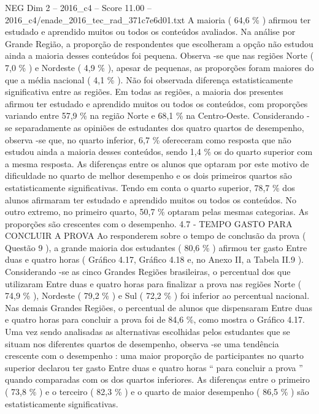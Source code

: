 \begin{textsample}{NEG Dim 2 – 2016\_c4 – Score 11.00 – 2016\_c4/enade\_2016\_tec\_rad\_371c7e6d01.txt}
A maioria ( 64,6 \% ) afirmou ter estudado e aprendido muitos ou todos os conteúdos avaliados.
Na análise por Grande Região, a proporção de respondentes que escolheram a opção não estudou ainda a maioria desses conteúdos foi pequena.
Observa -se que nas regiões Norte ( 7,0 \% ) e Nordeste ( 4,9 \% ), apesar de pequenas, as proporções foram maiores do que a média nacional ( 4,1 \% ).
Não foi observada diferença estatisticamente significativa entre as regiões.
Em todas as regiões, a maioria dos presentes afirmou ter estudado e aprendido muitos ou todos os conteúdos, com proporções variando entre 57,9 \% na região Norte e 68,1 \% na Centro-Oeste.
Considerando -se separadamente as opiniões de estudantes dos quatro quartos de desempenho, observa -se que, no quarto inferior, 6,7 \% ofereceram como resposta que não estudou ainda a maioria desses conteúdos, sendo 1,4 \% os do quarto superior com a mesma resposta.
As diferenças entre os alunos que optaram por este motivo de dificuldade no quarto de melhor desempenho e os dois primeiros quartos são estatisticamente significativas.
Tendo em conta o quarto superior, 78,7 \% dos alunos afirmaram ter estudado e aprendido muitos ou todos os conteúdos.
No outro extremo, no primeiro quarto, 50,7 \% optaram pelas mesmas categorias.
As proporções são crescentes com o desempenho. 4.7 - TEMPO GASTO PARA CONCLUIR A PROVA Ao responderem sobre o tempo de conclusão da prova ( Questão 9 ), a grande maioria dos estudantes ( 80,6 \% ) afirmou ter gasto Entre duas e quatro horas ( Gráfico 4.17, Gráfico 4.18 e, no Anexo II, a Tabela II.9 ).
Considerando -se as cinco Grandes Regiões brasileiras, o percentual dos que utilizaram Entre duas e quatro horas para finalizar a prova nas regiões Norte ( 74,9 \% ), Nordeste ( 79,2 \% ) e Sul ( 72,2 \% ) foi inferior ao percentual nacional.
Nas demais Grandes Regiões, o percentual de alunos que dispensaram Entre duas e quatro horas para concluir a prova foi de 84,6 \%, como mostra o Gráfico 4.17.
Uma vez sendo analisadas as alternativas escolhidas pelos estudantes que se situam nos diferentes quartos de desempenho, observa -se uma tendência crescente com o desempenho : uma maior proporção de participantes no quarto superior declarou ter gasto Entre duas e quatro horas “ para concluir a prova ” quando comparadas com os dos quartos inferiores.
As diferenças entre o primeiro ( 73,8 \% ) e o terceiro ( 82,3 \% ) e o quarto de maior desempenho ( 86,5 \% ) são estatisticamente significativas.

\end{textsample}
